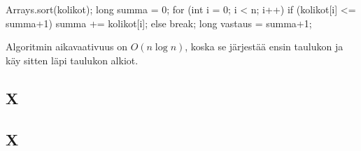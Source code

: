\begin{code}
Arrays.sort(kolikot);
long summa = 0;
for (int i = 0; i < n; i++) {
    if (kolikot[i] <= summa+1) {
        summa += kolikot[i];
    } else {
        break;
    }
}
long vastaus = summa+1;
\end{code}

Algoritmin aikavaativuus on $O(n \log n)$, koska se
järjestää ensin taulukon ja käy sitten läpi taulukon alkiot.

\subsection{X}

\subsection{X}
